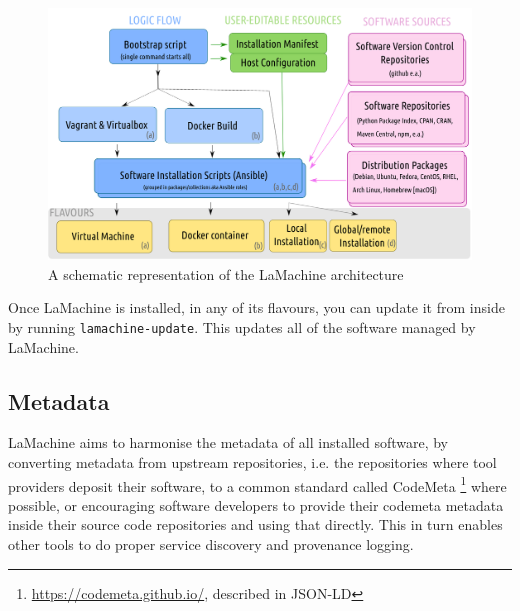\documentclass[a4paper,11pt]{article}
\begin{document}
%

\begin{figure}[htb] \begin{center}
\includegraphics[width=135.0mm]{architecture.png}
\end{center}
\caption{\footnotesize{A schematic representation of the LaMachine architecture}}
\label{fig:arch}
\end{figure}

Once LaMachine is installed, in any of its flavours, you can update it from inside by running
\texttt{lamachine-update}. This updates all of the software managed by LaMachine.

\subsection{Metadata}

LaMachine aims to harmonise the metadata of all installed software, by converting metadata from upstream
repositories, i.e. the repositories where tool providers deposit their software, to a common standard called CodeMeta
\footnote{\url{https://codemeta.github.io/}, described in JSON-LD} \cite{codemeta,codemetar} where possible, or
encouraging software developers to provide their codemeta metadata inside their source code repositories and using
that directly. This in turn enables other tools to do proper service discovery and provenance logging.
\end{document}

